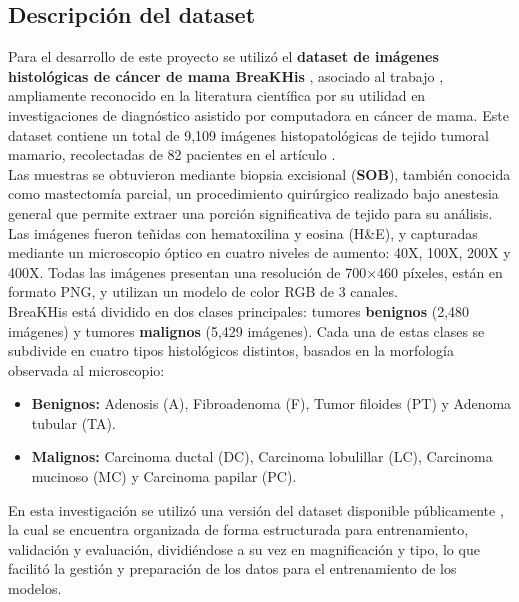 \documentclass[12pt]{article} %
\begin{document}
\subsection{Descripción del dataset}
Para el desarrollo de este proyecto se utilizó el \textbf{dataset de imágenes histológicas de cáncer de mama BreaKHis} \cite{google_drive_folder}, asociado al trabajo \cite{bardou2018classification}, ampliamente reconocido en la literatura científica por su utilidad en investigaciones de diagnóstico asistido por computadora en cáncer de mama. Este dataset contiene un total de 9,109 imágenes histopatológicas de tejido tumoral mamario, recolectadas de 82 pacientes en el artículo \cite{spanhol2015dataset}.\\

Las muestras se obtuvieron mediante biopsia excisional (\textbf{SOB}), también conocida como mastectomía parcial, un procedimiento quirúrgico realizado bajo anestesia general que permite extraer una porción significativa de tejido para su análisis. Las imágenes fueron teñidas con hematoxilina y eosina (H\&E), y capturadas mediante un microscopio óptico en cuatro niveles de aumento: 40X, 100X, 200X y 400X. Todas las imágenes presentan una resolución de 700×460 píxeles, están en formato PNG, y utilizan un modelo de color RGB de 3 canales. \\

BreaKHis está dividido en dos clases principales: tumores \textbf{benignos} (2,480 imágenes) y tumores \textbf{malignos} (5,429 imágenes). Cada una de estas clases se subdivide en cuatro tipos histológicos distintos, basados en la morfología observada al microscopio: \\

\begin{itemize}
    \item \textbf{Benignos:} Adenosis (A), Fibroadenoma (F), Tumor filoides (PT) y Adenoma tubular (TA).
    \item \textbf{Malignos:} Carcinoma ductal (DC), Carcinoma lobulillar (LC), Carcinoma mucinoso (MC) y Carcinoma papilar (PC).
\end{itemize}

En esta investigación se utilizó una versión del dataset disponible públicamente \cite{google_drive_folder}, la cual se encuentra organizada de forma estructurada para entrenamiento, validación y evaluación, dividiéndose a su vez en magnificación y tipo, lo que facilitó la gestión y preparación de los datos para el entrenamiento de los modelos. \\
\end{document}
